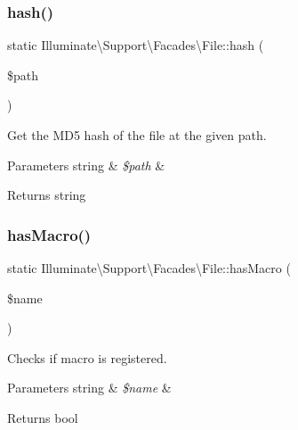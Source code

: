 \subsubsection{\texorpdfstring{hash()}{hash()}}
{\footnotesize\ttfamily static Illuminate\textbackslash{}\+Support\textbackslash{}\+Facades\textbackslash{}\+File\+::hash (\begin{DoxyParamCaption}\item[{}]{\$path }\end{DoxyParamCaption})\hspace{0.3cm}{\ttfamily [static]}}

Get the M\+D5 hash of the file at the given path.


\begin{DoxyParams}[1]{Parameters}
string & {\em \$path} & \\
\hline
\end{DoxyParams}
\begin{DoxyReturn}{Returns}
string 
\end{DoxyReturn}
\mbox{\label{class_illuminate_1_1_support_1_1_facades_1_1_file_a6c644afd704f28fdaa3459e8c030b1e7}} 
\subsubsection{\texorpdfstring{has\+Macro()}{hasMacro()}}
{\footnotesize\ttfamily static Illuminate\textbackslash{}\+Support\textbackslash{}\+Facades\textbackslash{}\+File\+::has\+Macro (\begin{DoxyParamCaption}\item[{}]{\$name }\end{DoxyParamCaption})\hspace{0.3cm}{\ttfamily [static]}}

Checks if macro is registered.


\begin{DoxyParams}[1]{Parameters}
string & {\em \$name} & \\
\hline
\end{DoxyParams}
\begin{DoxyReturn}{Returns}
bool 
\end{DoxyReturn}
\mbox{\label{class_illuminate_1_1_support_1_1_facades_1_1_file_a3237a565dc6ae8c24f4b02e9ae5c3767}} 
